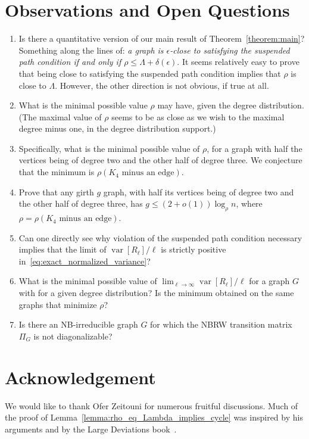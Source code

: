 \documentclass{article}
\DeclareMathOperator{\var}{var}
\begin{document}
\section{Observations and Open Questions}
\begin{enumerate}
    \item
        Is there a quantitative version of our main result of Theorem~\ref{theorem:main}? 
        Something along the lines of: {\em a graph is $\epsilon$-close to satisfying the suspended path condition if and only if $\rho \leq \Lambda + \delta(\epsilon)$}. It seems relatively easy to prove that being close to satisfying the suspended path condition implies that $\rho$ is close to $\Lambda$. However, the other direction is not obvious, if true at all.
    \item
        What is the minimal possible value $\rho$ may have, given the degree distribution.
        (The maximal value of $\rho$ seems to be as close as we wish to the maximal degree minus one, in the degree distribution support.)
    \item 
        Specifically, what is the minimal possible value of $\rho$, for a graph with half the vertices being of degree two and the other half of degree three. 
        We conjecture that the minimum is $\rho(K_4 \mbox{ minus an edge})$.
    \item 
        Prove that any girth $g$ graph, with half its vertices being of degree two and the other half of degree three, has 
        $g \leq (2+o(1)) \log_\rho n$, where $\rho = \rho(K_4 \mbox{ minus an edge})$.
    \item 
        Can one directly see why violation of the suspended path condition necessary implies that the limit of $\var[R_\ell]/\ell$ is strictly positive in~\eqref{eq:exact_normalized_variance}?
    \item 
        What is the minimal possible value of $\lim_{\ell \to \infty}\var[R_\ell]/\ell$ for a graph $G$ with for a given degree distribution?
        Is the minimum obtained on the same graphs that minimize $\rho$?
    \item
        Is there an  NB-irreducible graph $G$ for which the NBRW transition matrix $\Pi_G$ is not diagonalizable?
\end{enumerate}

\section{Acknowledgement}
    We would like to thank Ofer Zeitouni for numerous fruitful discussions. 
    Much of the proof of Lemma~\ref{lemma:rho_eq_Lambda_implies_cycle} 
    was inspired by his arguments and by the Large Deviations book~\cite{dembo2009large}.


\end{document}
